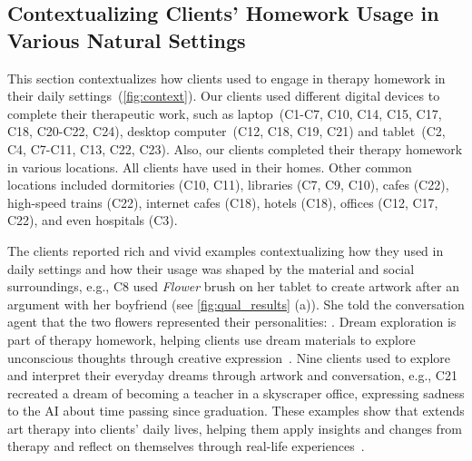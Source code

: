 \subsection{Contextualizing Clients' Homework Usage in Various Natural Settings}
This section contextualizes how clients used \name{} to engage in therapy homework in their daily settings~(\autoref{fig:context}). 
Our clients used different digital devices to complete their therapeutic work, such as laptop~(C1-C7, C10, C14, C15, C17, C18, C20-C22, C24), desktop computer~(C12, C18, C19, C21) and tablet~(C2, C4, C7-C11, C13, C22, C23). 
Also, our clients completed their therapy homework in various locations. All clients have used \name{} in their homes. Other common locations included dormitories (C10, C11), libraries (C7, C9, C10), cafes (C22), high-speed trains (C22), internet cafes (C18), hotels (C18), offices (C12, C17, C22), and even hospitals (C3).


The clients reported rich and vivid examples contextualizing how they used \name{} in daily settings and how their usage was shaped by the material and social surroundings, e.g., C8 used \textit{Flower} brush on her tablet to create artwork after an argument with her boyfriend (see \autoref{fig:qual_results} (a)). She told the conversation agent that the two flowers represented their personalities: .
Dream exploration is part of therapy homework, helping clients use dream materials to explore unconscious thoughts through creative expression~\cite{grotstein2009dreaming,freeman2002dreams}.
Nine clients used \name{} to explore and interpret their everyday dreams through artwork and conversation, e.g., C21 recreated a dream of becoming a teacher in a skyscraper office, expressing sadness to the AI about time passing since graduation.
These examples show that \name{} extends art therapy into clients' daily lives, helping them apply insights and changes from therapy and reflect on themselves through real-life experiences~\cite{kazantzis2007handbook}.
 
